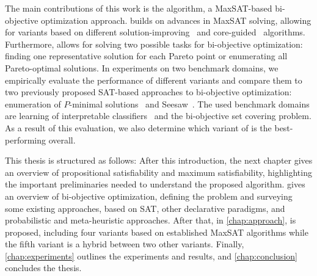 The main contributions of this work is the \algname{} algorithm, a MaxSAT-based bi-objective optimization approach.
\algname{} builds on advances in MaxSAT solving, allowing for variants based on different solution-improving~\autocites{handbook2-maxsat,DBLP:journals/jsat/BerreP10,DBLP:journals/jsat/EenS06} and core-guided~\autocites{DBLP:journals/corr/abs-0712-1097,DBLP:conf/sat/AnsoteguiBL09,DBLP:conf/cp/MorgadoDM14,DBLP:journals/jsat/IgnatievMM19} algorithms.
Furthermore, \algname{} allows for solving two possible tasks for bi-objective optimization: finding one representative solution for each Pareto point or enumerating all Pareto-optimal solutions.
In experiments on two benchmark domains, we empirically evaluate the performance of different \algname{} variants and compare them to two previously proposed SAT-based approaches to bi-objective optimization: enumeration of $P$-minimal solutions~\autocite{DBLP:conf/cp/SohBTB17} and Seesaw~\autocite{DBLP:conf/cp/JanotaMSM21}.
The used benchmark domains are learning of interpretable classifiers~\autocite{DBLP:conf/cp/MaliotovM18} and the bi-objective set covering problem.
As a result of this evaluation, we also determine which variant of \algname{} is the best-performing overall.

This thesis is structured as follows:
After this introduction, the next chapter gives an overview of propositional satisfiability and maximum satisfiability, highlighting the important preliminaries needed to understand the proposed algorithm.
 gives an overview of bi-objective optimization, defining the problem and surveying some existing approaches, based on SAT, other declarative paradigms, and probabilistic and meta-heuristic approaches.
After that, in \cref{chap:approach}, \algname{} is proposed, including four variants based on established MaxSAT algorithms while the fifth variant is a hybrid between two other variants.
Finally, \cref{chap:experiments} outlines the experiments and results, and \cref{chap:conclusion} concludes the thesis.
